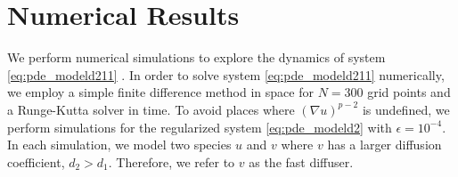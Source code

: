 \documentclass[10pt]{amsart}
\theoremstyle{plain}
\theoremstyle{definition}
\begin{document}
\section{Numerical Results}

We perform numerical simulations to explore the dynamics of system \eqref{eq:pde_modeld211} . 
In order to solve system \eqref{eq:pde_modeld211} numerically, we employ a simple finite difference method in space for $N=300$ grid points and a Runge-Kutta solver in time. To avoid places where $(\nabla u)^{p-2}$ is undefined, we perform simulations for the regularized system \eqref{eq:pde_modeld2} with $\epsilon = 10^{-4}$. In each simulation, we model two species $u$ and $v$ where $v$ has a larger diffusion coefficient, $d_2>d_1$. Therefore, we refer to $v$ as the fast diffuser. 
\end{document}
